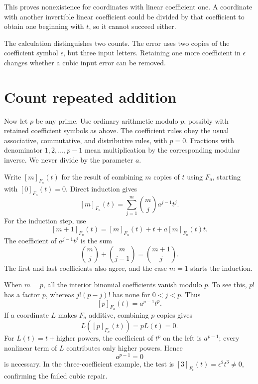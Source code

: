\documentclass[11pt,letterpaper]{article}
\numberwithin{equation}{section}
\theoremstyle{definition}\newtheorem{example}[theorem]{Example}
\begin{document}
This proves nonexistence for coordinates with linear coefficient one. A coordinate with another invertible linear coefficient could be divided by that coefficient to obtain one beginning with \(t\), so it cannot succeed either.

The calculation distinguishes two counts. The error uses two copies of the coefficient symbol \(\epsilon\), but three input letters. Retaining one more coefficient in \(\epsilon\) changes whether a cubic input error can be removed.

\section{Count repeated addition}\label{sec:repeated}

Now let \(p\) be any prime. Use ordinary arithmetic modulo \(p\), possibly with retained coefficient symbols as above. The coefficient rules obey the usual associative, commutative, and distributive rules, with \(p=0\). Fractions with denominator \(1,2,\ldots,p-1\) mean multiplication by the corresponding modular inverse. We never divide by the parameter \(a\).

Write \([m]_{F_a}(t)\) for the result of combining \(m\) copies of \(t\) using \(F_a\), starting with \([0]_{F_a}(t)=0\). Direct induction gives
\begin{equation}\label{eq:m-series}
 [m]_{F_a}(t)=\sum_{j=1}^{m}\binom mj a^{j-1}t^j.
\end{equation}
For the induction step, use
\[
 [m+1]_{F_a}(t)=[m]_{F_a}(t)+t+a[m]_{F_a}(t)t.
\]
The coefficient of \(a^{j-1}t^j\) is the sum
\[
 \binom mj+\binom m{j-1}=\binom{m+1}j.
\]
The first and last coefficients also agree, and the case \(m=1\) starts the induction.

When \(m=p\), all the interior binomial coefficients vanish modulo \(p\). To see this, \(p!\) has a factor \(p\), whereas \(j!(p-j)!\) has none for \(0<j<p\). Thus
\begin{equation}\label{eq:p-series}
 \boxed{\;[p]_{F_a}(t)=a^{p-1}t^p.\;}
\end{equation}
If a coordinate \(L\) makes \(F_a\) additive, combining \(p\) copies gives
\[
 L([p]_{F_a}(t))=pL(t)=0.
\]
For \(L(t)=t+\text{higher powers}\), the coefficient of \(t^p\) on the left is \(a^{p-1}\); every nonlinear term of \(L\) contributes only higher powers. Hence
\begin{equation}\label{eq:necessary}
 a^{p-1}=0
\end{equation}
is necessary. In the three-coefficient example, the test is \([3]_{F_\epsilon}(t)=\epsilon^2t^3\ne0\), confirming the failed cubic repair.
\end{document}
